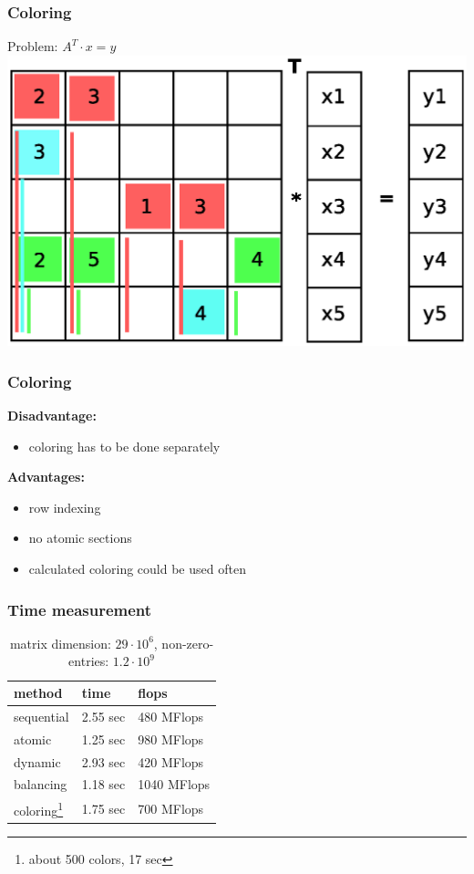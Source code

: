 \documentclass{beamer}
\begin{document}
\begin{frame}
\frametitle{Coloring}
Problem: $A^T \cdot x= y$
\includegraphics[width=0.8\linewidth]{graphic/coloringT10.eps}
\end{frame}

\begin{frame}
\frametitle{Coloring}
\textbf{Disadvantage:}
\begin{itemize}
\item coloring has to be done separately
\end{itemize}

\textbf{Advantages:}
\begin{itemize}
\item row indexing
\item no atomic sections
\item calculated coloring could be used often
\end{itemize}
\end{frame}

\begin{frame}
\frametitle{Time measurement}
\begin{table}
\begin{tabular}{l l l}
\toprule
\textbf{method} & \textbf{time} & \textbf{flops}\\
\midrule
sequential & 2.55 sec & 480 MFlops \\
atomic & 1.25 sec & 980 MFlops \\
dynamic & 2.93 sec & 420 MFlops \\
balancing & 1.18 sec & 1040 MFlops \\
coloring\footnote{about 500 colors, 17 sec} & 1.75 sec & 700 MFlops \\
\bottomrule
\end{tabular}
\caption{matrix dimension: $29\cdot 10^6$, non-zero-entries: $1.2\cdot 10^9$}
\end{table}
\end{frame}
\end{document}
